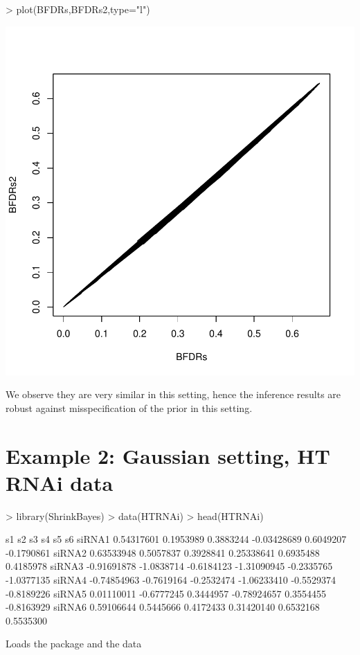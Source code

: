 \documentclass[11pt]{article}
\begin{document}
\begin{Schunk}
\begin{Sinput}
> plot(BFDRs,BFDRs2,type="l")
\end{Sinput}
\end{Schunk}
\includegraphics{ShrinkBayes-030}


\noindent
We observe they are very similar in this setting, hence the inference results are robust against misspecification
of the prior in this setting.


\section{Example 2: Gaussian setting, HT RNAi data}\label{htrnai}
\begin{Schunk}
\begin{Sinput}
> library(ShrinkBayes)
> data(HTRNAi)
> head(HTRNAi)
\end{Sinput}
\begin{Soutput}
                s1         s2         s3          s4         s5         s6
siRNA1  0.54317601  0.1953989  0.3883244 -0.03428689  0.6049207 -0.1790861
siRNA2  0.63533948  0.5057837  0.3928841  0.25338641  0.6935488  0.4185978
siRNA3 -0.91691878 -1.0838714 -0.6184123 -1.31090945 -0.2335765 -1.0377135
siRNA4 -0.74854963 -0.7619164 -0.2532474 -1.06233410 -0.5529374 -0.8189226
siRNA5  0.01110011 -0.6777245  0.3444957 -0.78924657  0.3554455 -0.8163929
siRNA6  0.59106644  0.5445666  0.4172433  0.31420140  0.6532168  0.5535300
\end{Soutput}
\end{Schunk}
Loads the package and the data
\end{document}
